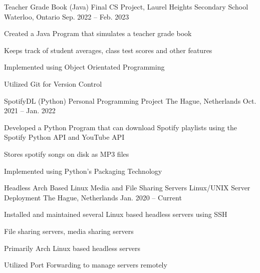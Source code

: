 \begin{cventries}
  \cventry
    {Teacher Grade Book (Java)} %
    {Final CS Project, Laurel Heights Secondary School} %
    {Waterloo, Ontario} %
    {Sep. 2022 -- Feb. 2023} %
    {
      \begin{cvitems} %
        \item {Created a Java Program that simulates a teacher grade book}
        \item {Keeps track of student averages, class test scores and other features}
        \item {Implemented using Object Orientated Programming}
        \item {Utilized Git for Version Control}
      \end{cvitems}
    }
  \cventry
    {SpotifyDL (Python)} %
    {Personal Programming Project} %
    {The Hague, Netherlands} %
    {Oct. 2021 -- Jan. 2022} %
    {
      \begin{cvitems} %
        \item {Developed a Python Program that can download Spotify playlists using the Spotify Python API and YouTube API}
        \item {Stores spotify songs on disk as MP3 files}
        \item {Implemented using Python's Packaging Technology}
      \end{cvitems}
    }
  \cventry
    {Headless Arch Based Linux Media and File Sharing Servers} %
    {Linux/UNIX Server Deployment} %
    {The Hague, Netherlands} %
    {Jan. 2020 -- Current} %
    {
      \begin{cvitems} %
        \item {Installed and maintained several Linux based headless servers using SSH}
        \item {File sharing servers, media sharing servers}
        \item {Primarily Arch Linux based headless servers}
        \item {Utilized Port Forwarding to manage servers remotely}
      \end{cvitems}
    }
\end{cventries}
